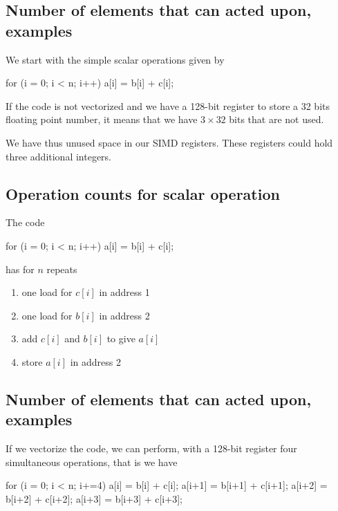 \documentclass[%
oneside,                 %
final,                   %
10pt]{article}
\begin{document}
\noindent
\subsection{Number of elements that can acted upon, examples}
We start with the simple scalar operations given by




\bcppcod
for (i = 0; i < n; i++){
    a[i] = b[i] + c[i];
}

\ecppcod

If the code is not vectorized  and we have a 128-bit register to store a 32 bits floating point number,
it means that we have $3\times 32$ bits that are not used. 

We have thus unused space in our SIMD registers. These registers could hold three additional integers.

\subsection{Operation counts for scalar operation}
The code




\bcppcod
for (i = 0; i < n; i++){
    a[i] = b[i] + c[i];
}

\ecppcod

has for $n$ repeats
\begin{enumerate}
\item one load for $c[i]$ in address 1

\item one load for $b[i]$ in address 2

\item add $c[i]$ and $b[i]$ to give $a[i]$

\item store $a[i]$ in address 2
\end{enumerate}

\noindent
\subsection{Number of elements that can acted upon, examples}
If we vectorize the code, we can perform, with a 128-bit register four simultaneous operations, that is
we have







\bcppcod
for (i = 0; i < n; i+=4){
    a[i] = b[i] + c[i];
    a[i+1] = b[i+1] + c[i+1];
    a[i+2] = b[i+2] + c[i+2];
    a[i+3] = b[i+3] + c[i+3];
}
\end{document}
